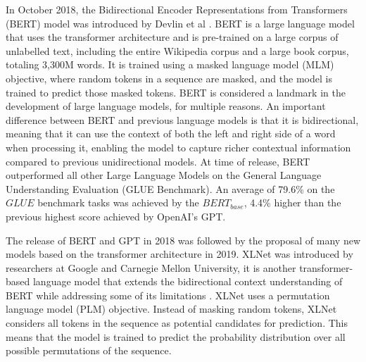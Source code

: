 \documentclass{UoYCSproject}
\begin{document}
    In October 2018, the Bidirectional Encoder Representations from Transformers (BERT) model was introduced by Devlin et al \cite{devlin2019bert} .
    BERT is a large language model that uses the transformer architecture and is pre-trained on a large corpus of unlabelled text, including the entire Wikipedia corpus and a large book corpus, totaling 3,300M words.
    It is trained using a masked language model (MLM) objective, where random tokens in a sequence are masked, and the model is trained to predict those masked tokens.
    BERT is considered a landmark in the development of large language models, for multiple reasons.
    An important difference between BERT and previous language models is that it is bidirectional, meaning that it can
    use the context of both the left and right side of a word when processing it, enabling the model to capture richer contextual information compared to previous unidirectional models.
    At time of release, BERT outperformed all other Large Language Models on the General Language Understanding Evaluation (GLUE Benchmark).
    An average of 79.6\% on the $GLUE$ benchmark tasks was achieved by the $BERT_{base}$, 4.4\% higher than the previous highest score achieved by OpenAI's GPT.

    The release of BERT and GPT in 2018 was followed by the proposal of many new models based on the transformer architecture in 2019.
    XLNet was introduced by researchers at Google and Carnegie Mellon University, it is another transformer-based language model that extends the bidirectional context understanding of BERT while addressing some of its limitations \cite{yang2020xlnet}.
    XLNet uses a permutation language model (PLM) objective.
    Instead of masking random tokens, XLNet considers all tokens in the sequence as potential candidates for prediction.
    This means that the model is trained to predict the probability distribution over all possible permutations of the sequence. \par
\end{document}
